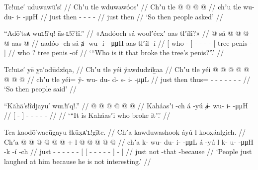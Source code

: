 \ex\label{ex:93-44-first-one-broke-off}%
%
\begingl
	\glpreamble	Tc!uʟe′ uduwawū′s! //
	\glpreamble	Chʼu tle wduwawóosʼ //
	\gla	Chʼu tle  @ {} @ {} @ {} @ {} //
	\glb	chʼu tle wu- du- i-  -μμH //
	\glc	just then - - -  - //
	\gld	just then  {} {} {} {} {} //
	\glft	‘So then people asked’
		//
\endgl
\xe

\ex\label{ex:93-45-who-broke-trees-penis}%
%
\begingl
	\glpreamble	“Adō′tsᴀ wuʟ!ī′q! ās-ʟ!ē′łî.” //
	\glpreamble	«\!Aadóoch sá woolʼéexʼ aas tlʼíli?\!» //
	\gla	{}  @ {} {} sá 
		 @ {} @ {} @ {} @ {}
		{} aas  @ {} {} //
	\glb	{} aadóo -ch {} sá 
		ⱥ- wu- i-  -μμH
		{} aas tlʼíl -í {} //
	\glc	{}[ who - {}] 
		- - -  -
		{}[ tree penis - {}] //
	\gld	{} who {} {} ?
		 {} {} {} {}
		{} tree penis -of {} //
	\glft	‘“Who is it that broke the tree’s penis?”.’
		//
\endgl
\xe

\ex\label{ex:93-46-people-said}%
%
\begingl
	\glpreamble	Tc!uʟe′ yē ỵa′odūdzîqa, //
	\glpreamble	Chʼu tle yéi ÿawdudziḵaa //
	\gla	Chʼu tle yéi @  @ {} @ {} @ {} @ {} @ {} @ {} @ {} //
	\glb	chʼu tle yéi= ÿ- wu- du- d- s- i-  -μμL //
	\glc	just then thus= - - - - - -  - //
	\glft	‘So then people said’
		//
\endgl
\xe

\ex\label{ex:93-47-people-said}%
%
\begingl
	\glpreamble	“Kāhā′s!îdjayu′ wuʟ!ī′q!.” //
	\gla	{}  @ {} {}
		 @ {}
		 @ {} @ {} @ {} @ {} //
	\glb	{} Kaháasʼi -ch {}
		á -yú
		ⱥ- wu- i-  -μμH //
	\glc	{}[  - {}]
		 -
		- - -  - //
	\gld	{}  {} {}
		 {}
		 {} {} {} {} //
	\glft	‘“It is Kaháasʼi who broke it”.’
		//
\endgl
\xe

\ex\label{ex:93-48-laugh-uninteresting}%
%
\begingl
	\glpreamble	Tca kaodō′wacūg̣ayu łkūx̣ᴀ′ʟ!gītc. //
	\glpreamble	Chʼa kawduwashooḵ áyú l koox̱áalgich. //
	\gla	Chʼa  @ {} @ {} @ {} @ {} @ {}
		 @ {} +
		{} {} l  @ {} @ {} @ {} @ {} @ {} {} {} {} //
	\glb	chʼa k- wu- du- i-  -μμL
		á -yú
		{} {} l k- u-  -μμH -k -í {} -ch {} //
	\glc	just - - - -  -
		 -
		{}[ {}[  - -  - - - {}]
			- {}] //
	\gld	just  {} {} {} {} {}
		 {}
		{} {} not  {} {} {} {} -that {} -because {} //
	\glft	‘People just laughed at him because he is not interesting.’
		//
\endgl
\xe

